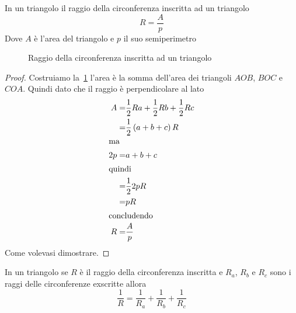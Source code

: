 \begin{thm}\label{thm:raggiocirconferenzainscrittatriangolo}
In un triangolo il raggio della circonferenza inscritta ad un triangolo
\[R=\dfrac{A}{p}\]
Dove $A$ è l'area del triangolo e $p$ il suo semiperimetro
\end{thm}
\begin{figure}
	\centering
	
	\caption{Raggio della circonferenza inscritta ad un triangolo}
	\label{fig:raggiocirconferenzainscrittatriangolo}
\end{figure}
\begin{proof}
		Costruiamo la~\cref{fig:raggiocirconferenzainscrittatriangolo} l'area è la somma dell'area dei  triangoli $AOB$, $BOC$ e $COA$. Quindi dato che il raggio è perpendicolare al lato
		\begin{align*}
			A=&\dfrac{1}{2}Ra+\dfrac{1}{2}Rb+\dfrac{1}{2}Rc\\
			=&\dfrac{1}{2}\left(a+b+c\right)R\\
			\intertext{ma}
			2p=&a+b+c\\
			\intertext{quindi}
			=&\dfrac{1}{2}2pR\\
			=&pR\\
			\intertext{concludendo}
			R=&\dfrac{A}{p}\\
		\end{align*}
	Come volevasi dimostrare.
\end{proof} 
\begin{thm}\label{thm:Raggiocirconferenzainscrittaexscritta}
	In un triangolo se $R$ è il raggio della circonferenza inscritta e $R_a$, $R_b$ e $R_c$ sono i raggi delle circonferenze exscritte allora\[\dfrac{1}{R}=\dfrac{1}{R_a}+\dfrac{1}{R_b}+\dfrac{1}{R_c}\]
\end{thm}
